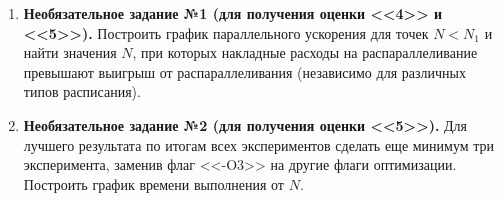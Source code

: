 \begin{enumerate}
     вычислительную сложность алгоритма до и после распараллеливания, сравнить полученные результаты.
    
     иллюстрации того, что программа действительно распараллелилась, привести график загрузки процессора (ядер) от времени при выполнении программы при $N = N_1$ для лучшего варианта распараллеливания. Для получения графика можно как написать скрипт, так и просто сделать скриншот диспетчера задач, указав на скриншоте моменты начала и окончания эксперимента (в отчёте нужно привести текст скрипта или название использованного диспетчера). Недостаточно привести однократное моментальное измерение загрузки утилитой htop, т.к. требуется привести график изменения загрузки за всё время выполнения программы.
    
     отчёт о проделанной работе.
    
     к устным вопросам на защите.
    
    \item\textbf{Необязательное задание №1 (для получения оценки <<4>> и <<5>>).} Построить график параллельного ускорения для точек $N < N_1$ и найти значения $N$, при которых накладные расходы на распараллеливание превышают выигрыш от распараллеливания (независимо для различных типов расписания).
    
    \item \textbf{Необязательное задание №2 (для получения оценки <<5>>).} Для лучшего результата по итогам всех экспериментов сделать еще минимум три эксперимента, заменив флаг <<-O3>> на другие флаги оптимизации. Построить график времени выполнения от $N$.
\end{enumerate}